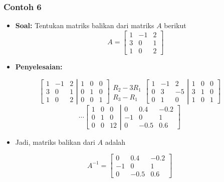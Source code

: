\documentclass[pdflatex,compress,mathserif]{beamer}
\begin{document}
\begin{frame}
	\frametitle{Contoh 6}
	\begin{itemize}
		\item \textbf{Soal:} Tentukan matriks balikan dari matriks $ A $ berikut
		\[ A = \begin{bmatrix}
			1 & -1 & 2 \\
			3 & 0 & 1 \\
			1 & 0 & 2
		\end{bmatrix} \]
	\end{itemize}
\end{frame}

\begin{frame}
	\begin{itemize}
		\item \textbf{Penyelesaian:}
	\end{itemize}
	\[
	\left[
		\begin{matrix}
			1 & -1 & 2 \\
			3 & 0 & 1 \\
			1 & 0 & 2
		\end{matrix}
	\right|
	\left.
		\begin{matrix}
			1 & 0 & 0 \\
			0 & 1 & 0 \\
			0 & 0 & 1
		\end{matrix}
	\right]
	\begin{matrix}
		\\
		R_2 - 3R_1 \\
		R_3 - R_1
	\end{matrix}
	\left[
		\begin{matrix}
			1 & -1 & 2 \\
			0 & 3 & -5 \\
			0 & 1 & 0
		\end{matrix}
	\right|
	\left.
		\begin{matrix}
			1 & 0 & 0 \\
			3 & 1 & 0 \\
			1 & 0 & 1
		\end{matrix}
	\right]
	\]
	\[
	\cdots
	\left[
		\begin{matrix}
		1 & 0 & 0 \\
		0 & 1 & 0 \\
		0 & 0 & 12
		\end{matrix}
	\right|
	\left.
		\begin{matrix}
		0 & 0.4 & -0.2 \\
		-1 & 0 & 1 \\
		0 & -0.5 & 0.6
		\end{matrix}
	\right]
	\]
	\begin{itemize}
		\item[] Jadi, matriks balikan dari $ A $ adalah
	\end{itemize}
	\[
	A^{-1} = 
	\begin{bmatrix}
		0 & 0.4 & -0.2 \\
		-1 & 0 & 1 \\
		0 & -0.5 & 0.6
	\end{bmatrix}
	\]
\end{frame}
\end{document}
